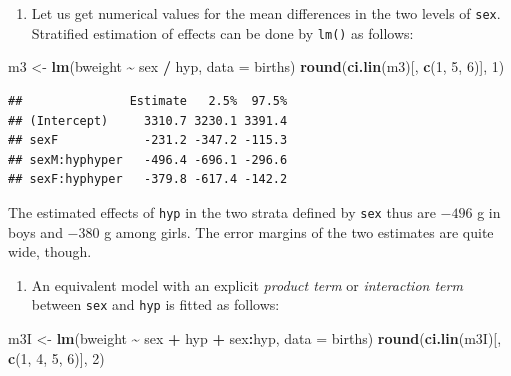 \documentclass[
]{book}
\newenvironment{Shaded}{\begin{snugshade}}{\end{snugshade}}
\newcommand{\AttributeTok}[1]{\textcolor[rgb]{0.13,0.29,0.53}{#1}}
\newcommand{\DecValTok}[1]{\textcolor[rgb]{0.00,0.00,0.81}{#1}}
\newcommand{\FunctionTok}[1]{\textcolor[rgb]{0.13,0.29,0.53}{\textbf{#1}}}
\newcommand{\NormalTok}[1]{#1}
\newcommand{\OtherTok}[1]{\textcolor[rgb]{0.56,0.35,0.01}{#1}}
\newcommand{\SpecialCharTok}[1]{\textcolor[rgb]{0.81,0.36,0.00}{\textbf{#1}}}
\providecommand{\tightlist}{%
  \setlength{\itemsep}{0pt}\setlength{\parskip}{0pt}}
\theoremstyle{definition}
\theoremstyle{definition}
\theoremstyle{definition}
\theoremstyle{definition}
\theoremstyle{remark}
\begin{document}
\begin{enumerate}
\def\labelenumi{\arabic{enumi}.}
\setcounter{enumi}{1}
\tightlist
\item
  Let us get numerical values for the mean differences
  in the two levels of \texttt{sex}.
  Stratified estimation of effects can be done by \texttt{lm()} as follows:
\end{enumerate}

\begin{Shaded}
\begin{Highlighting}[]
\NormalTok{m3 }\OtherTok{\textless{}{-}} \FunctionTok{lm}\NormalTok{(bweight }\SpecialCharTok{\textasciitilde{}}\NormalTok{ sex }\SpecialCharTok{/}\NormalTok{ hyp, }\AttributeTok{data =}\NormalTok{ births)}
\FunctionTok{round}\NormalTok{(}\FunctionTok{ci.lin}\NormalTok{(m3)[, }\FunctionTok{c}\NormalTok{(}\DecValTok{1}\NormalTok{, }\DecValTok{5}\NormalTok{, }\DecValTok{6}\NormalTok{)], }\DecValTok{1}\NormalTok{)}
\end{Highlighting}
\end{Shaded}

\begin{verbatim}
##               Estimate   2.5%  97.5%
## (Intercept)     3310.7 3230.1 3391.4
## sexF            -231.2 -347.2 -115.3
## sexM:hyphyper   -496.4 -696.1 -296.6
## sexF:hyphyper   -379.8 -617.4 -142.2
\end{verbatim}

The estimated effects of \texttt{hyp} in the two strata defined by \texttt{sex} thus
are \(-496\) g in boys and \(-380\) g among girls.
The error margins of the two estimates are quite wide, though.

\begin{enumerate}
\def\labelenumi{\arabic{enumi}.}
\setcounter{enumi}{2}
\tightlist
\item
  An equivalent model with an explicit \emph{product term} or
  \emph{interaction term} between \texttt{sex} and \texttt{hyp} is
  fitted as follows:
\end{enumerate}

\begin{Shaded}
\begin{Highlighting}[]
\NormalTok{m3I }\OtherTok{\textless{}{-}} \FunctionTok{lm}\NormalTok{(bweight }\SpecialCharTok{\textasciitilde{}}\NormalTok{ sex }\SpecialCharTok{+}\NormalTok{ hyp }\SpecialCharTok{+}\NormalTok{ sex}\SpecialCharTok{:}\NormalTok{hyp, }\AttributeTok{data =}\NormalTok{ births)}
\FunctionTok{round}\NormalTok{(}\FunctionTok{ci.lin}\NormalTok{(m3I)[, }\FunctionTok{c}\NormalTok{(}\DecValTok{1}\NormalTok{, }\DecValTok{4}\NormalTok{, }\DecValTok{5}\NormalTok{, }\DecValTok{6}\NormalTok{)], }\DecValTok{2}\NormalTok{)}
\end{Highlighting}
\end{Shaded}
\end{document}
